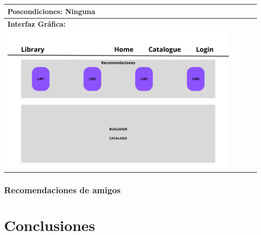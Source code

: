 \documentclass{report}
\begin{document}
\begin{center}
\begin{tabular}{|p{\linewidth}|}
                    \hline
                    \textbf{Poscondiciones:} Ninguna\\
                    \hline
                    \textbf{Interfaz Gráfica:}\\
                    \begin{minipage}{\textwidth}
                        \centering
                        \includegraphics[width=0.9\textwidth]{./img/grafico/recom_lib.png}
                    \end{minipage}\\
                    \hline
                \end{tabular}
            \end{center}
        \clearpage
        \subsection{Recomendaciones de amigos}
    \chapter{Conclusiones} 
\end{document}
